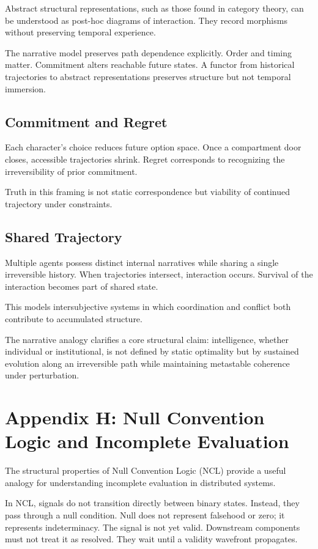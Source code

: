 \documentclass[12pt]{article}
\begin{document}
Abstract structural representations, such as those found in category theory, can be understood as post-hoc diagrams of interaction. They record morphisms without preserving temporal experience.

The narrative model preserves path dependence explicitly. Order and timing matter. Commitment alters reachable future states. A functor from historical trajectories to abstract representations preserves structure but not temporal immersion.

\subsection*{Commitment and Regret}

Each character's choice reduces future option space. Once a compartment door closes, accessible trajectories shrink. Regret corresponds to recognizing the irreversibility of prior commitment.

Truth in this framing is not static correspondence but viability of continued trajectory under constraints.

\subsection*{Shared Trajectory}

Multiple agents possess distinct internal narratives while sharing a single irreversible history. When trajectories intersect, interaction occurs. Survival of the interaction becomes part of shared state.

This models intersubjective systems in which coordination and conflict both contribute to accumulated structure.

\bigskip

The narrative analogy clarifies a core structural claim: intelligence, whether individual or institutional, is not defined by static optimality but by sustained evolution along an irreversible path while maintaining metastable coherence under perturbation.

\section*{Appendix H: Null Convention Logic and Incomplete Evaluation}

The structural properties of Null Convention Logic (NCL) provide a useful analogy for understanding incomplete evaluation in distributed systems.

In NCL, signals do not transition directly between binary states. Instead, they pass through a null condition. Null does not represent falsehood or zero; it represents indeterminacy. The signal is not yet valid. Downstream components must not treat it as resolved. They wait until a validity wavefront propagates.
\end{document}
